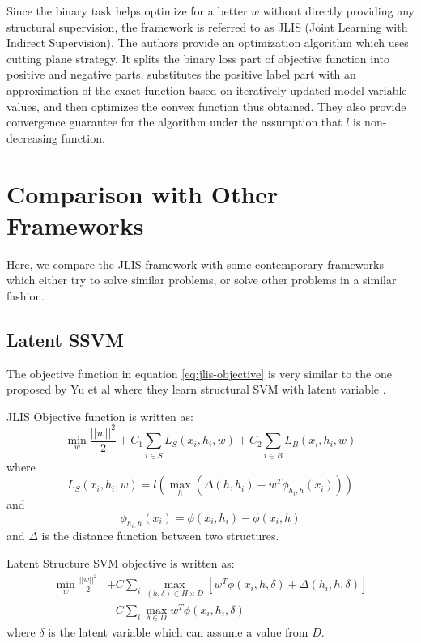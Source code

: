 \documentclass{acm_proc_article-sp}
\begin{document}
Since the binary task helps optimize for a better $w$ without directly providing any structural supervision, the framework is referred to as JLIS (Joint Learning with Indirect Supervision). The authors provide an optimization algorithm which uses cutting plane strategy. It splits the binary loss part of objective function into positive and negative parts, substitutes the positive label part with an approximation of the exact function based on iteratively updated model variable values, and then optimizes the convex function thus obtained. They also provide convergence guarantee for the algorithm under the assumption that $l$ is non-decreasing function.


\section{Comparison with Other Frameworks}
\label{sec:comparison}
Here, we compare the JLIS framework with some contemporary frameworks which either try to solve similar problems, or solve other problems in a similar fashion.

\subsection{Latent SSVM}
\label{subsec:latent-ssvm}
The objective function in equation \ref{eq:jlis-objective} is very similar to the one proposed by Yu et al where they learn structural SVM with latent variable \cite{ssvm}.

JLIS Objective function is written as:
\begin{equation*}
\min_w \frac{||w||^2}{2} + C_1\sum_{i \in S} L_S(x_i,h_i,w) + C_2\sum_{i \in B} L_B(x_i,h_i,w)
\end{equation*}
where
\begin{equation}
L_S(x_i,h_i,w) = l \left( \max_h(\Delta(h,h_i) - w^T\phi_{h_i,h}(x_i)) \right)
\end{equation}
and
\begin{equation}
\phi_{h_i,h}(x_i) = \phi(x_i,h_i) - \phi(x_i,h)
\end{equation}
and $\Delta$ is the distance function between two structures.

Latent Structure SVM objective is written as:
\begin{align*}
\min_w \frac{||w||^2}{2} &+ C\sum_{i} \max_{(h,\delta) \in H \times D} [w^T \phi(x_i,h,\delta) + \Delta(h_i,h,\delta)] \\
&- C\sum_{i} \max_{\delta \in D} w^T \phi(x_i,h_i,\delta)
\end{align*}
where $\delta$ is the latent variable which can assume a value from $D$.
\end{document}
